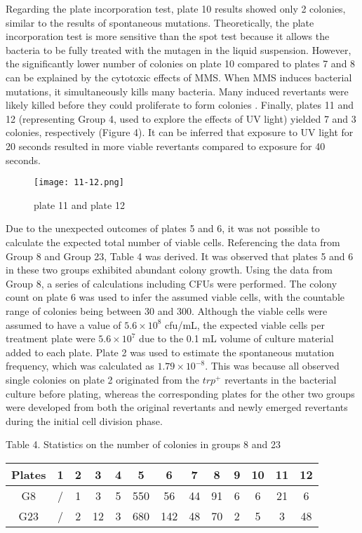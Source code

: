 \documentclass[a4paper,10pt]{article}
\begin{document}
\begin{multicols}{2}
Regarding the plate incorporation test, plate 10 results showed only 2 colonies, similar to the results of spontaneous mutations. Theoretically, the plate incorporation test is more sensitive than the spot test because it allows the bacteria to be fully treated with the mutagen in the liquid suspension. However, the significantly lower number of colonies on plate 10 compared to plates 7 and 8 can be explained by the cytotoxic effects of MMS. When MMS induces bacterial mutations, it simultaneously kills many bacteria. Many induced revertants were likely killed before they could proliferate to form colonies \cite{grzesiuk1998role}. Finally, plates 11 and 12 (representing Group 4, used to explore the effects of UV light) yielded 7 and 3 colonies, respectively (Figure 4). It can be inferred that exposure to UV light for 20 seconds resulted in more viable revertants compared to exposure for 40 seconds.


\begin{figure}[H]
\centering
\texttt{[image: 11-12.png]}
\caption{plate 11 and plate 12} \label{fig4}
\end{figure}


Due to the unexpected outcomes of plates 5 and 6, it was not possible to calculate the expected total number of viable cells. Referencing the data from Group 8 and Group 23, Table 4 was derived. It was observed that plates 5 and 6 in these two groups exhibited abundant colony growth. Using the data from Group 8, a series of calculations including CFUs were performed. The colony count on plate 6 was used to infer the assumed viable cells, with the countable range of colonies being between 30 and 300. Although the viable cells were assumed to have a value of $5.6\times10^8$ cfu/mL, the expected viable cells per treatment plate were $5.6\times10^7$ due to the 0.1 mL volume of culture material added to each plate. Plate 2 was used to estimate the spontaneous mutation frequency, which was calculated as $1.79\times10^{-8}$. This was because all observed single colonies on plate 2 originated from the $trp^+$ revertants in the bacterial culture before plating, whereas the corresponding plates for the other two groups were developed from both the original revertants and newly emerged revertants during the initial cell division phase.


\begin{center}
{\footnotesize Table 4. Statistics on the number of colonies in groups 8 and 23}
\vspace{0pt}
\begin{table}[H]
\setlength{\tabcolsep}{5pt}
\footnotesize
\begin{tabular}{ccccccccccccc}
\toprule [1pt]
Plates&1&2&3&4&5&6&7&8&9&10&11&12\\
\hline
G8&/&1&3&5&550&56&44&91&6&6&21&6\\
G23&/&2&12&3&680&142&48&70&2&5&3&48\\
\bottomrule [1pt]
\end{tabular}
\end{table}
\end{center}






\end{multicols}
\end{document}
